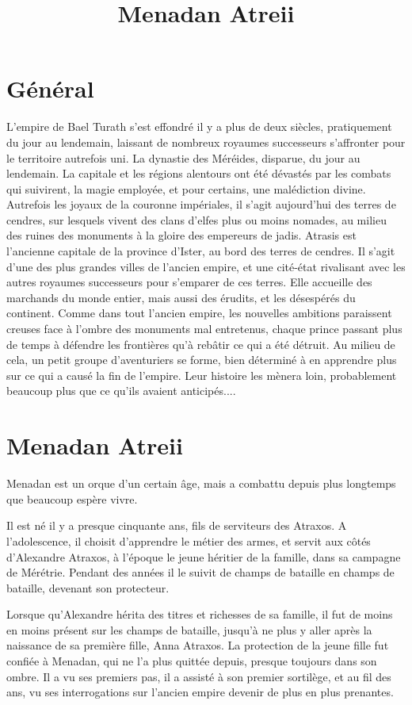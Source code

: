 \documentclass[10pt,a4paper]{article}
\author{ }
\title{Menadan Atreii}
\author{}
\begin{document}
\maketitle
\section{Général}
L'empire de Bael Turath s'est effondré il y a plus de deux siècles, pratiquement du jour au lendemain, laissant de nombreux royaumes successeurs s'affronter pour le territoire autrefois uni. La dynastie des Méréides, disparue, du jour au lendemain. La capitale et les régions alentours ont été dévastés par les combats qui suivirent, la magie employée, et pour certains, une malédiction divine. Autrefois les joyaux de la couronne impériales, il s'agit aujourd'hui des terres de cendres, sur lesquels vivent des clans d'elfes plus ou moins nomades, au milieu des ruines des monuments à la gloire des empereurs de jadis.
Atrasis est l'ancienne capitale de la province d'Ister, au bord des terres de cendres. Il s'agit d'une des plus grandes villes de l'ancien empire, et une cité-état rivalisant avec les autres royaumes successeurs pour s'emparer de ces terres. Elle accueille des marchands du monde entier, mais aussi des érudits, et les désespérés du continent.
Comme dans tout l'ancien empire, les nouvelles ambitions paraissent creuses face à l'ombre des monuments mal entretenus, chaque prince passant plus de temps à défendre les frontières qu'à rebâtir ce qui a été détruit.
Au milieu de cela, un petit groupe d'aventuriers se forme, bien déterminé à en apprendre plus sur ce qui a causé la fin de l'empire. Leur histoire les mènera loin, probablement beaucoup plus que ce qu'ils avaient anticipés....
\section{Menadan Atreii}
Menadan est un orque d'un certain âge, mais a combattu depuis plus longtemps que beaucoup espère vivre.

Il est né il y a presque cinquante ans, fils de serviteurs des Atraxos. A l'adolescence, il choisit d'apprendre le métier des armes, et servit aux côtés d'Alexandre Atraxos, à l'époque le jeune héritier de la famille, dans sa campagne de Mérétrie. Pendant des années il le suivit de champs de bataille en champs de bataille, devenant son protecteur.

Lorsque qu'Alexandre hérita des titres et richesses de sa famille, il fut de moins en moins présent sur les champs de bataille, jusqu'à ne plus y aller après la naissance de sa première fille, Anna Atraxos. La protection de la jeune fille fut confiée à Menadan, qui ne l'a plus quittée depuis, presque toujours dans son ombre. Il a vu ses premiers pas, il a assisté à son premier sortilège, et au fil des ans, vu ses interrogations sur l'ancien empire devenir de plus en plus prenantes.
\end{document}
